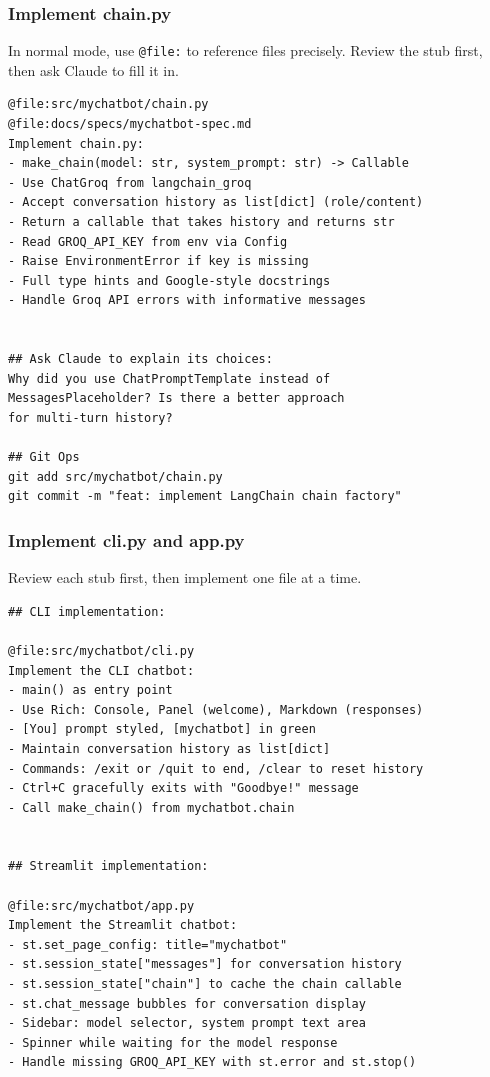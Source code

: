 \begin{frame}[fragile]\frametitle{Implement chain.py}
In normal mode, use \texttt{@file:} to reference files precisely. Review the stub first, then ask Claude to fill it in.

\begin{lstlisting}
@file:src/mychatbot/chain.py
@file:docs/specs/mychatbot-spec.md
Implement chain.py:
- make_chain(model: str, system_prompt: str) -> Callable
- Use ChatGroq from langchain_groq
- Accept conversation history as list[dict] (role/content)
- Return a callable that takes history and returns str
- Read GROQ_API_KEY from env via Config
- Raise EnvironmentError if key is missing
- Full type hints and Google-style docstrings
- Handle Groq API errors with informative messages


## Ask Claude to explain its choices:
Why did you use ChatPromptTemplate instead of
MessagesPlaceholder? Is there a better approach
for multi-turn history?

## Git Ops
git add src/mychatbot/chain.py
git commit -m "feat: implement LangChain chain factory"
\end{lstlisting}
\end{frame}


\begin{frame}[fragile]\frametitle{Implement cli.py and app.py}
Review each stub first, then implement one file at a time.

\begin{lstlisting}
## CLI implementation:

@file:src/mychatbot/cli.py
Implement the CLI chatbot:
- main() as entry point
- Use Rich: Console, Panel (welcome), Markdown (responses)
- [You] prompt styled, [mychatbot] in green
- Maintain conversation history as list[dict]
- Commands: /exit or /quit to end, /clear to reset history
- Ctrl+C gracefully exits with "Goodbye!" message
- Call make_chain() from mychatbot.chain


## Streamlit implementation:

@file:src/mychatbot/app.py
Implement the Streamlit chatbot:
- st.set_page_config: title="mychatbot"
- st.session_state["messages"] for conversation history
- st.session_state["chain"] to cache the chain callable
- st.chat_message bubbles for conversation display
- Sidebar: model selector, system prompt text area
- Spinner while waiting for the model response
- Handle missing GROQ_API_KEY with st.error and st.stop()
\end{lstlisting}
\end{frame}



